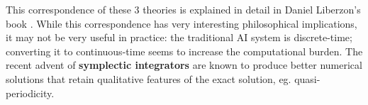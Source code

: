 \documentclass[orivec]{llncs}
\makeatletter
\newcommand{\emp}[1]{\textbf{#1}}
\newcommand{\vect}[1]{\boldsymbol{#1}}
\renewcommand{\boxed}[1]{\fbox{\m@th$\displaystyle\scalebox{0.9}{#1}$} \,}
\makeatother
\begin{document}
	
	This correspondence of these 3 theories is explained in detail in Daniel Liberzon's book \cite{Liberzon2012}.  While this correspondence has very interesting philosophical implications, it may not be very useful in practice:  the traditional AI system is discrete-time; converting it to continuous-time seems to increase the computational burden.  The recent advent of \textbf{symplectic integrators} \cite{} are known to produce better numerical solutions that retain qualitative features of the exact solution, eg. quasi-periodicity.
	

\end{document}
